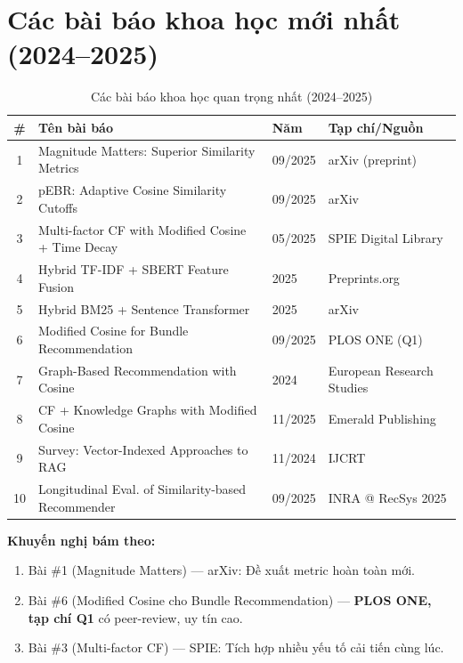 \documentclass[12pt,a4paper]{article}
\begin{document}
\section{Các bài báo khoa học mới nhất (2024--2025)}
\label{sec:papers}

\begin{table}[H]
\centering
\caption{Các bài báo khoa học quan trọng nhất (2024--2025)}
\label{tab:papers}
\small
\begin{tabular}{@{}clll@{}}
\toprule
\textbf{\#} & \textbf{Tên bài báo} & \textbf{Năm} & \textbf{Tạp chí/Nguồn} \\
\midrule
1 & Magnitude Matters: Superior Similarity Metrics & 09/2025 & arXiv (preprint) \\
2 & pEBR: Adaptive Cosine Similarity Cutoffs & 09/2025 & arXiv \\
3 & Multi-factor CF with Modified Cosine + Time Decay & 05/2025 & SPIE Digital Library \\
4 & Hybrid TF-IDF + SBERT Feature Fusion & 2025 & Preprints.org \\
5 & Hybrid BM25 + Sentence Transformer & 2025 & arXiv \\
6 & Modified Cosine for Bundle Recommendation & 09/2025 & PLOS ONE (Q1) \\
7 & Graph-Based Recommendation with Cosine & 2024 & European Research Studies \\
8 & CF + Knowledge Graphs with Modified Cosine & 11/2025 & Emerald Publishing \\
9 & Survey: Vector-Indexed Approaches to RAG & 11/2024 & IJCRT \\
10 & Longitudinal Eval. of Similarity-based Recommender & 09/2025 & INRA @ RecSys 2025 \\
\bottomrule
\end{tabular}
\end{table}

\noindent\textbf{Khuyến nghị bám theo:}
\begin{enumerate}
    \item Bài \#1 (Magnitude Matters) --- arXiv: Đề xuất metric hoàn toàn mới.
    \item Bài \#6 (Modified Cosine cho Bundle Recommendation) --- \textbf{PLOS ONE, tạp chí Q1} có peer-review, uy tín cao.
    \item Bài \#3 (Multi-factor CF) --- SPIE: Tích hợp nhiều yếu tố cải tiến cùng lúc.
\end{enumerate}
\end{document}

